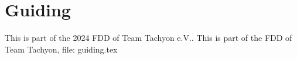 \section{Guiding}
This is part of the 2024 FDD of Team Tachyon e.V..
This is part of the FDD of Team Tachyon, file: guiding.tex
